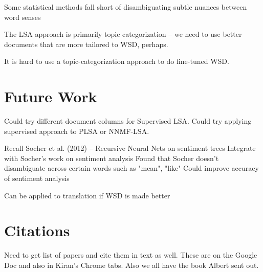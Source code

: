 \documentclass[10pt, letterpaper]{article}
\begin{document}
	Some statistical methods fall short of disambiguating subtle nuances between word senses	

	The LSA approach is primarily topic categorization -- we need to use better documents that are more tailored to WSD, perhaps. 	

	It is hard to use a topic-categorization approach to do fine-tuned WSD. 

	\section{Future Work}
	Could try different document columns for Supervised LSA.
	Could try applying supervised approach to PLSA or NNMF-LSA.	

	Recall Socher et al. (2012) -- Recursive Neural Nets on sentiment trees
	Integrate with Socher's work on sentiment analysis
	Found that Socher doesn't disambiguate across certain words such as "mean", "like"
	Could improve accuracy of sentiment analysis	

	Can be applied to translation if WSD is made better

	\section{Citations} 

	Need to get list of papers and cite them in text as well. These are on the Google Doc and also in Kiran's Chrome tabs. Also we all have the book Albert sent out.
\end{document}
